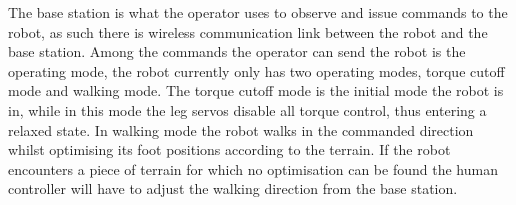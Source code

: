         The base station is what the operator uses to observe and issue commands to the robot, as such there is wireless communication link between the robot and the base station.
        Among the commands the operator can send the robot is the operating mode, the robot currently only has two operating modes, torque cutoff mode and walking mode. The torque cutoff mode is the initial mode the robot is in, while in this mode the leg servos disable all torque control, thus entering a relaxed state. In walking mode the robot walks in the commanded direction whilst optimising its foot positions according to the terrain. If the robot encounters a piece of terrain for which no optimisation can be found the human controller will have to adjust the walking direction from the base station.

